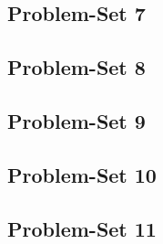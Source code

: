 \subsection{Problem-Set 7}
\subsection{Problem-Set 8}
\subsection{Problem-Set 9}
\subsection{Problem-Set 10}
\subsection{Problem-Set 11}

